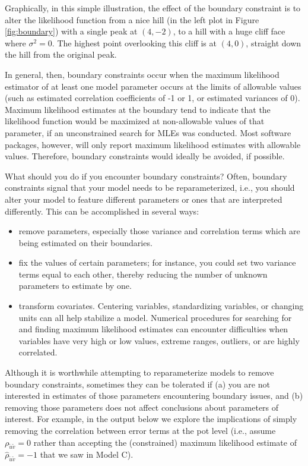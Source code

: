 \documentclass[
]{krantz}
\providecommand{\tightlist}{%
  \setlength{\itemsep}{0pt}\setlength{\parskip}{0pt}}
\begin{document}
Graphically, in this simple illustration, the effect of the boundary constraint is to alter the likelihood function from a nice hill (in the left plot in Figure \ref{fig:boundary}) with a single peak at \((4,-2)\), to a hill with a huge cliff face where \(\sigma^2=0\). The highest point overlooking this cliff is at \((4,0)\), straight down the hill from the original peak.

In general, then, boundary constraints occur when the maximum likelihood estimator of at least one model parameter occurs at the limits of allowable values (such as estimated correlation coefficients of -1 or 1, or estimated variances of 0). Maximum likelihood estimates at the boundary tend to indicate that the likelihood function would be maximized at non-allowable values of that parameter, if an unconstrained search for MLEs was conducted. Most software packages, however, will only report maximum likelihood estimates with allowable values. Therefore, boundary constraints would ideally be avoided, if possible.

What should you do if you encounter boundary constraints? Often, boundary constraints signal that your model needs to be reparameterized, i.e., you should alter your model to feature different parameters or ones that are interpreted differently. This can be accomplished in several ways:

\begin{itemize}
\tightlist
\item
  remove parameters, especially those variance and correlation terms which are being estimated on their boundaries.
\item
  fix the values of certain parameters; for instance, you could set two variance terms equal to each other, thereby reducing the number of unknown parameters to estimate by one.
\item
  transform covariates. Centering variables, standardizing variables, or changing units can all help stabilize a model. Numerical procedures for searching for and finding maximum likelihood estimates can encounter difficulties when variables have very high or low values, extreme ranges, outliers, or are highly correlated.
\end{itemize}

Although it is worthwhile attempting to reparameterize models to remove boundary constraints, sometimes they can be tolerated if (a) you are not interested in estimates of those parameters encountering boundary issues, and (b) removing those parameters does not affect conclusions about parameters of interest. For example, in the output below we explore the implications of simply removing the correlation between error terms at the pot level (i.e., assume \(\rho_{\tilde{u}\tilde{v}}=0\) rather than accepting the (constrained) maximum likelihood estimate of \(\hat{\rho}_{\tilde{u}\tilde{v}}=-1\) that we saw in Model C).
\end{document}
